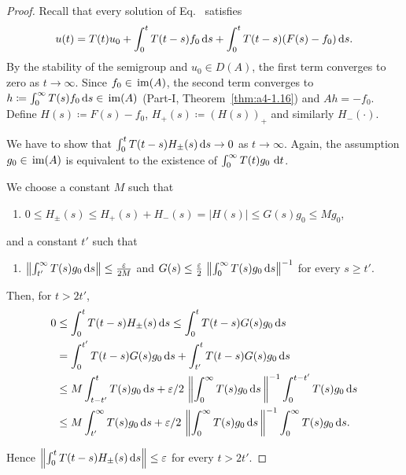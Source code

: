 \begin{proof}
Recall that every solution of Eq.~ satisfies
\begin{equation}\label{eq:c4-1.7}
u(t) = T(t)u_0 + \int_{0}^{t} T(t-s)f_{0} \mathop{}\!\mathrm{d}{s} + \int_{0}^{t} T(t-s)(F(s) - f_{0}) \mathop{}\!\mathrm{d}{s}.
\end{equation}
By the stability of the semigroup and $u_0 \in D(A)$, the first term converges to zero as $t \to \infty$.
Since $f_{0} \in \mathop{}\mathrm{im}(A)$, the second term converges to $h \coloneq  \int_{0}^{\infty} T(s)f_{0} \mathop{}\!\mathrm{d}{s} \in \mathop{}\mathrm{im}(A)$ (Part-I, Theorem~\ref{thm:a4-1.16}) and $Ah = -f_{0}$.
Define $H(s) \coloneq F(s) - f_{0}$, 
$ H_{+}(s) \coloneq (H(s))_{+} $ 
and similarly $H_{-}(\cdot)$.

We have to show that $\int_{0}^{t} T(t-s)H_{\pm}(s) \mathop{}\!\mathrm{d}{s} \to 0$ as $t \to \infty$.
Again, the assumption $g_{0} \in \mathop{}\mathrm{im}(A)$ is equivalent to the existence of\/ $\int_{0}^{\infty} T(t)g_{0} \, \mathop{}\!\mathrm{d}{t}$.

We choose a constant $M$  such that 
\begin{enumerate}[\upshape (i)]
    \item 
    $0 \leq H_{\pm}(s) \leq H_{+}(s) + H_{-}(s) = |H(s)| \leq G(s)g_{0} \leq Mg_{0}$,
\end{enumerate}
and a constant $t'$ such that
\begin{enumerate}
    \item $ \left\|\int_{t'}^{\infty} T(s)g_{0} \ds\right\| \leq \frac{\epsilon}{2M}$ and  
$G(s) \leq \frac{\epsilon}{2} \,  \left\|\int_{0}^{\infty} T(s)g_{0} \ds\right\|^{-1}$ for every $s \geq t'$.
\end{enumerate}
Then, for $t > 2t'$,
\begin{align*}
	0 &\leq \int_{0}^{t} T(t-s)H_{\pm}(s) \ds \leq \int_{0}^{t} T(t-s)G(s)g_{0} \ds\\
	&= \int_{0}^{t'} T(t-s)G(s)g_{0} \ds + \int_{t'}^{t} T(t-s)G(s)g_{0} \ds\\
	&\leq M \int_{t-t'}^{t} T(s)g_{0} \ds + \epsilon/2 \,  \left\|\int_{0}^{\infty} T(s)g_{0} \ds\, \right\|^{-1} \int_{0}^{t-t'} T(s)g_{0} \ds\\
	&\leq M \int_{t'}^{\infty} T(s)g_{0} \ds + \epsilon/2 \,  \left\|\int_{0}^{\infty} T(s)g_{0} \ds\, \right\|^{-1} \int_{0}^{\infty} T(s)g_{0} \ds.
\end{align*}

Hence $\left\|\int_{0}^{t} T(t-s)H_{\pm}(s) \ds\right\| \leq \epsilon$ for every $t > 2t'$.
\end{proof}
